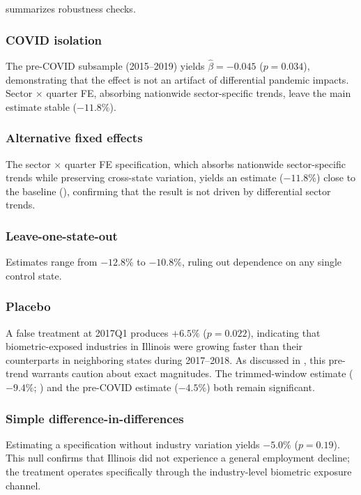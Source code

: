 \documentclass[12pt]{article}
\begin{document}
 summarizes robustness checks.

\subsubsection*{COVID isolation} The pre-COVID subsample (2015--2019) yields $\hat{\beta} = -0.045$ ($p = 0.034$), demonstrating that the effect is not an artifact of differential pandemic impacts. Sector $\times$ quarter FE, absorbing nationwide sector-specific trends, leave the main estimate stable ($-11.8\%$).

\subsubsection*{Alternative fixed effects} The sector $\times$ quarter FE specification, which absorbs nationwide sector-specific trends while preserving cross-state variation, yields an estimate ($-11.8\%$) close to the baseline (), confirming that the result is not driven by differential sector trends.

\subsubsection*{Leave-one-state-out} Estimates range from $-12.8\%$ to $-10.8\%$, ruling out dependence on any single control state.

\subsubsection*{Placebo} A false treatment at 2017Q1 produces $+6.5\%$ ($p = 0.022$), indicating that biometric-exposed industries in Illinois were growing faster than their counterparts in neighboring states during 2017--2018. As discussed in , this pre-trend warrants caution about exact magnitudes. The trimmed-window estimate ($-9.4\%$; ) and the pre-COVID estimate ($-4.5\%$) both remain significant.

\subsubsection*{Simple difference-in-differences} Estimating a specification without industry variation yields $-5.0\%$ ($p = 0.19$). This null confirms that Illinois did not experience a general employment decline; the treatment operates specifically through the industry-level biometric exposure channel.
\end{document}
